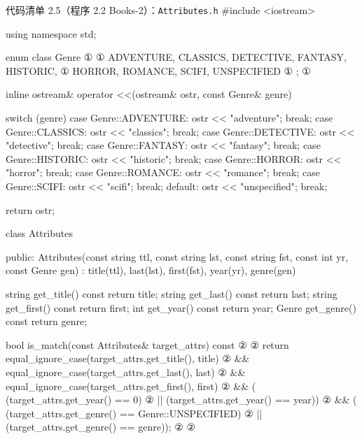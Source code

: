 \begin{codeboxt}{代码清单 2.5（程序 2.2 Books-2）：\texttt{Attributes.\allowbreak{}h}}
#include <iostream>

using namespace std;

enum class Genre                                                    ①
{                                                                   ①
    ADVENTURE, CLASSICS, DETECTIVE, FANTASY, HISTORIC,              ①
    HORROR, ROMANCE, SCIFI, UNSPECIFIED                             ①
};                                                                  ①

inline ostream& operator <<(ostream& ostr, const Genre& genre)
{
    switch (genre)
    {
        case Genre::ADVENTURE: ostr << "adventure"; break;
        case Genre::CLASSICS:  ostr << "classics";  break;
        case Genre::DETECTIVE: ostr << "detective"; break;
        case Genre::FANTASY:   ostr << "fantasy";   break;
        case Genre::HISTORIC:  ostr << "historic";  break;
        case Genre::HORROR:    ostr << "horror";    break;
        case Genre::ROMANCE:   ostr << "romance";   break;
        case Genre::SCIFI:     ostr << "scifi";     break;
        default: ostr << "unspecified"; break;
    }

    return ostr;
}

class Attributes
{
public:
    Attributes(const string ttl,
               const string lst, const string fst,
               const int yr, const Genre gen)
        : title(ttl), last(lst), first(fst),
          year(yr), genre(gen) {}

    string get_title() const { return title; }
    string get_last()  const { return last; }
    string get_first() const { return first; }
    int    get_year()  const { return year; }
    Genre  get_genre() const { return genre; }

    bool is_match(const Attributes& target_attrs) const               ②
    {                                                                 ②
        return equal_ignore_case(target_attrs.get_title(), title)     ②
            && equal_ignore_case(target_attrs.get_last(),  last)      ②
            && equal_ignore_case(target_attrs.get_first(), first)     ②
            && (    (target_attrs.get_year()  == 0)                   ②
                ||  (target_attrs.get_year()  == year))               ②
            && (    (target_attrs.get_genre() == Genre::UNSPECIFIED)  ②  
                ||  (target_attrs.get_genre() == genre));             ②
    }                                                                 ②

}
\end{codeboxt}
